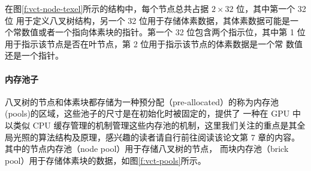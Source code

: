 在图\ref{f:vct-node-texel}所示的结构中，每个节点总共占据 $2\times 32$ 位，其中第一个 32 位 用于定义八叉树结构，另一个 32 位用于存储体素数据，其体素数据可能是一 个常数值或者一个指向体素块的指针。第一个 32 位包含两个指示位，其中第 1 位用于指示该节点是否在叶节点，第 2 位用于指示该节点的体素数据是一个常 数值还是一个指针。



\paragraph{内存池子}
八叉树的节点和体素块都存储为一种预分配（pre-allocated）的称为内存池 (pools)的区域，这些池子的尺寸是在初始化时被固定的，\cite{a:Gigavoxels:Avoxelbasedrenderingpipelineforefficientexplorationoflargeanddetailedscenes}提供了 一种在 GPU 中以类似 CPU 缓存管理的机制管理这些内存池的机制，这里我们关注的重点是其全局光照的算法结构及原理，感兴趣的读者请自行前往阅读该论文第 7 章的内容。其中的节点内存池（node pool）用于存储八叉树的节点， 而块内存池（brick pool）用于存储体素块的数据，如图\ref{f:vct-pools}所示。

